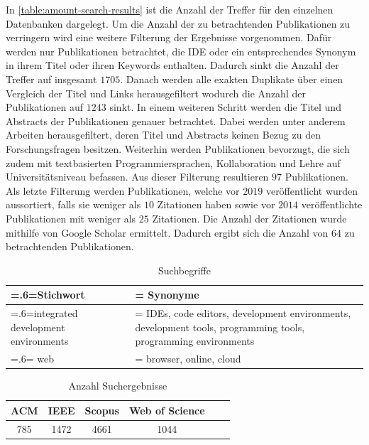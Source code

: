 In \autoref{table:amount-search-results} ist die Anzahl der Treffer für den einzelnen Datenbanken dargelegt. Um die Anzahl der zu betrachtenden Publikationen zu verringern wird eine weitere Filterung der Ergebnisse vorgenommen. Dafür werden nur Publikationen betrachtet, die IDE oder ein entsprechendes Synonym in ihrem Titel oder ihren Keywords enthalten. Dadurch sinkt die Anzahl der Treffer auf insgesamt $1705$. Danach werden alle exakten Duplikate über einen Vergleich der Titel und Links herausgefiltert wodurch die Anzahl der Publikationen auf $1243$ sinkt. In einem weiteren Schritt werden die Titel und Abstracts der Publikationen genauer betrachtet. Dabei werden unter anderem Arbeiten herausgefiltert, deren Titel und Abstracts keinen Bezug zu den Forschungsfragen besitzen. Weiterhin werden Publikationen bevorzugt, die sich zudem mit textbasierten Programmiersprachen, Kollaboration und Lehre auf Universitätsniveau befassen. Aus dieser Filterung resultieren $97$ Publikationen. Als letzte Filterung werden Publikationen, welche vor $2019$ veröffentlicht wurden aussortiert, falls sie weniger als $10$ Zitationen haben sowie vor $2014$ veröffentlichte Publikationen mit weniger als $25$ Zitationen. Die Anzahl der Zitationen wurde mithilfe von Google Scholar ermittelt. Dadurch ergibt sich die Anzahl von $64$ zu betrachtenden Publikationen.

\begin{table}[tbp]
    \centering
    \begin{tabularx}{\textwidth}{| >{\hsize=.6\hsize\linewidth=\hsize}X |
            >{\hsize=1.4\hsize\linewidth=\hsize}X |}
        \hline
        Stichwort                           & Synonyme                                                                                                     \\
        \hline
        integrated development environments & IDEs, code editors, development environments, development tools, programming tools, programming environments \\
        \hline
        web                                 & browser, online, cloud                                                                                       \\
        \hline
    \end{tabularx}
    \caption{Suchbegriffe}
    \label{table:search-terms}
\end{table}

\begin{table}[tbp]
    \centering
    \begin{tabular}{|c|c|c|c|c|c|}
        \hline
        ACM & IEEE & Scopus & Web of Science \\
        \hline
        785 & 1472 & 4661   & 1044           \\
        \hline
    \end{tabular}
    \caption{Anzahl Suchergebnisse}
    \label{table:amount-search-results}
\end{table}

